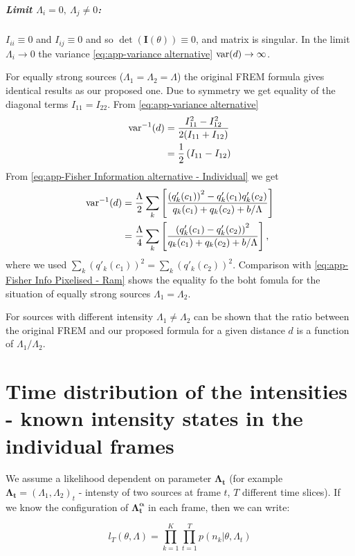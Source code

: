 \subparagraph*{Limit $\Lambda_i=0,\ \Lambda_j\neq0$:}
$I_{ii}\equiv0$ and $I_{ij}\equiv0$ and so $\det(\bm{I}(\theta))\equiv0$, and matrix is singular. In the limit $\Lambda_i\rightarrow0$ the
variance \autoref{eq:app-variance alternative} $\mathrm{var}(d)\rightarrow\infty$. 


For equally strong sources ($\Lambda_1= \Lambda_2=\Lambda$) the original FREM formula gives identical results as our proposed one. Due to symmetry we get equality of the diagonal terms $I_{11}=I_{22}$. From \autoref{eq:app-variance alternative}
\begin{alignat}{1}
	\mathrm{var}^{-1}(d)
	&=\frac{I_{11}^2-I_{12}^2}{2(I_{11}+I_{12})}\nonumber\\
	&=\frac{1}{2}\left(I_{11}-I_{12}\right)
\end{alignat}
%
From  \autoref{eq:app-Fisher Information alternative - Individual} we get
\begin{alignat}{2}
	\mathrm{var}^{-1}(d)
	&=\frac{\Lambda}{2}\sum_k\left[\frac{\left(q'_k(c_1)\right)^2-q'_k(c_1)q'_k(c_2)}{q_k(c_1)+q_k(c_2)+b/\Lambda} \right]\nonumber\\
	&=\frac{\Lambda}{4}\sum_k\left[\frac{\left(q'_k(c_1)-q'_k(c_2)\right)^2}{q_k(c_1)+q_k(c_2)+b/\Lambda} \right],
\end{alignat}
% 
where we used $\sum_k\left(q'_k(c_1)\right)^2=\sum_k\left(q'_k(c_2)\right)^2$. Comparison with \autoref{eq:app-Fisher Info Pixelised - Ram} shows the equality fo the boht fomula for the situation of equally strong sources $\Lambda_1=\Lambda_2$.

For sources with different intensity $\Lambda_1\neq\Lambda_2$ can be shown that the ratio between the original FREM and our proposed formula for a given distance $d$ is a function of $\Lambda_1/\Lambda_2$. 


\section{Time distribution of the intensities - known intensity states in the individual frames\label{sec:Appendix - blinking not integrated}}
We assume a likelihood dependent on parameter $\bm{\Lambda_t}$ (for example $\bm{\Lambda_t}=(\Lambda_1,\Lambda_2)_t$ - intensty of two sources at frame $t$, $T$ different time slices). If we know the configuration of $\bm{\Lambda^\alpha_t}$ in each frame, then we can write: 

\begin{equation}
	l_T(\theta,\Lambda)=\prod_{k=1}^K\prod_{t=1}^Tp(n_k|\theta,\Lambda_t)
\end{equation}

